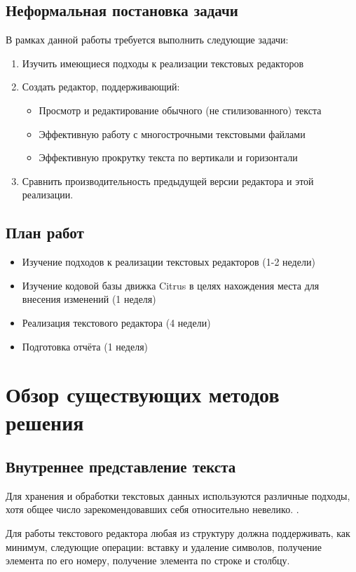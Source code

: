\documentclass{fefu}
\begin{document}
		\subsection{Неформальная постановка задачи}
			В рамках данной работы требуется выполнить следующие задачи:
			\begin{enumerate}
				\item Изучить имеющиеся подходы к реализации текстовых редакторов
				\item Создать редактор, поддерживающий:
				\begin{itemize}
					\setlength{\itemindent}{-3em}
					\item Просмотр и редактирование обычного (не стилизованного) текста
					\item Эффективную работу с многострочными текстовыми файлами
					\item Эффективную прокрутку текста по вертикали и горизонтали
				\end{itemize}
				\item Сравнить производительность предыдущей версии редактора и этой
				реализации.
			\end{enumerate}
		\subsection{План работ}
			\begin{itemize}
				\item Изучение подходов к реализации текстовых редакторов (1-2 недели)
				\item Изучение кодовой базы движка Citrus в целях нахождения места для внесения
				изменений (1 неделя)
				\item Реализация текстового редактора (4 недели)
				\item Подготовка отчёта (1 неделя)
			\end{itemize}
	\section{Обзор существующих методов решения}
		\subsection{Внутреннее представление текста}
			\par Для хранения и обработки текстовых данных используются различные подходы,
				хотя общее число зарекомендовавших себя относительно невелико.
				\cite{TextEditorDataStructures}.
			\par Для работы текстового редактора любая из структуру должна поддерживать, как 
			минимум, следующие операции: вставку и удаление символов, получение элемента по его
			номеру, получение элемента по строке и столбцу.
\end{document}

